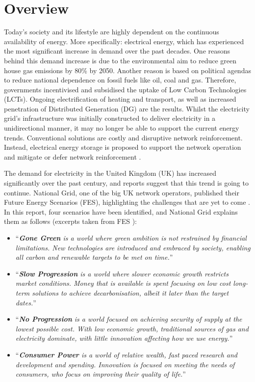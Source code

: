 \section{Overview}
\label{ch-introduction:sec:overview}

Today's society and its lifestyle are highly dependent on the continuous availability of energy.
More specifically: electrical energy, which has experienced the most significant increase in demand over the past decades.
One reasons behind this demand increase is due to the environmental aim to reduce green house gas emissions by 80\% by 2050.
Another reason is based on political agendas to reduce national dependence on fossil fuels like oil, coal and gas.
Therefore, governments incentivised and subsidised the uptake of Low Carbon Technologies (LCTs).
Ongoing electrification of heating and transport, as well as increased penetration of Distributed Generation (DG) are the results.
Whilst the electricity grid's infrastructure was initially constructed to deliver electricity in a unidirectional manner, it may no longer be able to support the current energy trends.
Conventional solutions are costly and disruptive network reinforcement.
Instead, electrical energy storage is proposed to support the network operation and mitigate or defer network reinforcement \cite{Manz2012, Kleinberg2014}.

The demand for electricity in the United Kingdom (UK) has increased significantly over the past century, and reports suggest that this trend is going to continue.
National Grid, one of the big UK network operators, published their Future Energy Scenarios (FES), highlighting the challenges that are yet to come \cite{FES2015}.
In this report, four scenarios have been identified, and National Grid explains them as follows (excerpts taken from FES \cite{FES2015}):

\begin{itemize}
	\item ``\textit{\textbf{Gone Green} is a world where green ambition is not restrained by financial limitations. New technologies are introduced and embraced by society, enabling all carbon and renewable targets to be met on time.}''
	\item ``\textit{\textbf{Slow Progression} is a world where slower economic growth restricts market conditions. Money that is available is spent focusing on low cost long-term solutions to achieve decarbonisation, albeit it later than the target dates.}''
	\item ``\textit{\textbf{No Progression} is a world focused on achieving security of supply at the lowest possible cost. With low economic growth, traditional sources of gas and electricity dominate, with little innovation affecting how we use energy.}''
	\item ``\textit{\textbf{Consumer Power} is a world of relative wealth, fast paced research and development and spending. Innovation is focused on meeting the needs of consumers, who focus on improving their quality of life.}''
\end{itemize}

